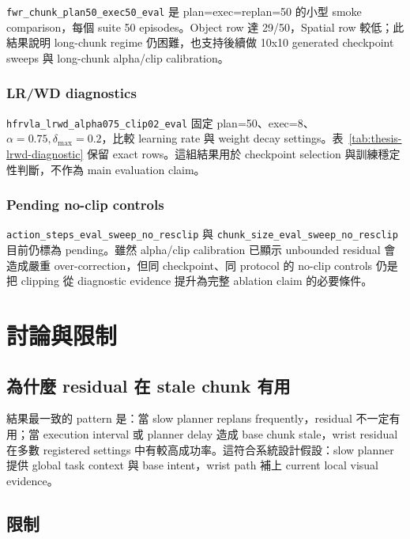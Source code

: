 \documentclass[12pt,a4paper,oneside]{report}
\newcommand{\dmax}{\delta_{\max}}
\begin{document}
\texttt{fwr\_chunk\_plan50\_exec50\_eval} 是 plan=exec=replan=50 的小型 smoke comparison，每個 suite 50 episodes。Object row 達 29/50，Spatial row 較低；此結果說明 long-chunk regime 仍困難，也支持後續做 10x10 generated checkpoint sweeps 與 long-chunk alpha/clip calibration。

\subsection{LR/WD diagnostics}

\texttt{hfrvla\_lrwd\_alpha075\_clip02\_eval} 固定 plan=50、exec=8、$\alpha=0.75,\dmax=0.2$，比較 learning rate 與 weight decay settings。表~\ref{tab:thesis-lrwd-diagnostic} 保留 exact rows。這組結果用於 checkpoint selection 與訓練穩定性判斷，不作為 main evaluation claim。

\subsection{Pending no-clip controls}

\texttt{action\_steps\_eval\_sweep\_no\_resclip} 與 \texttt{chunk\_size\_eval\_sweep\_no\_resclip} 目前仍標為 pending。雖然 alpha/clip calibration 已顯示 unbounded residual 會造成嚴重 over-correction，但同 checkpoint、同 protocol 的 no-clip controls 仍是把 clipping 從 diagnostic evidence 提升為完整 ablation claim 的必要條件。

\chapter{討論與限制}
\label{chap:discussion}

\section{為什麼 residual 在 stale chunk 有用}

結果最一致的 pattern 是：當 slow planner replans frequently，residual 不一定有用；當 execution interval 或 planner delay 造成 base chunk stale，wrist residual 在多數 registered settings 中有較高成功率。這符合系統設計假設：slow planner 提供 global task context 與 base intent，wrist path 補上 current local visual evidence。

\section{限制}
\end{document}
